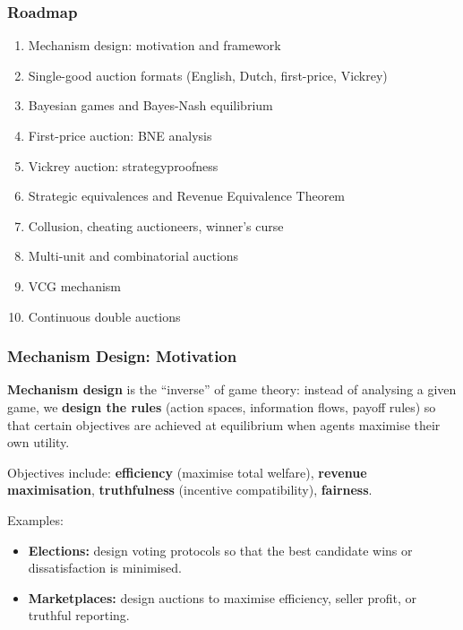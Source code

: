 \subsubsection*{Roadmap}
\begin{enumerate}
  \item Mechanism design: motivation and framework
  \item Single-good auction formats (English, Dutch, first-price, Vickrey)
  \item Bayesian games and Bayes-Nash equilibrium
  \item First-price auction: BNE analysis
  \item Vickrey auction: strategyproofness
  \item Strategic equivalences and Revenue Equivalence Theorem
  \item Collusion, cheating auctioneers, winner's curse
  \item Multi-unit and combinatorial auctions
  \item VCG mechanism
  \item Continuous double auctions
\end{enumerate}

\bigseparator

\subsubsection{Mechanism Design: Motivation}

\begin{defbox}
\textbf{Mechanism design} is the ``inverse'' of game theory: instead of analysing a given game, we \textbf{design the rules} (action spaces, information flows, payoff rules) so that certain objectives are achieved at equilibrium when agents maximise their own utility.

Objectives include: \textbf{efficiency} (maximise total welfare), \textbf{revenue maximisation}, \textbf{truthfulness} (incentive compatibility), \textbf{fairness}.
\end{defbox}

Examples:
\begin{itemize}
  \item \textbf{Elections:} design voting protocols so that the best candidate wins or dissatisfaction is minimised.
  \item \textbf{Marketplaces:} design auctions to maximise efficiency, seller profit, or truthful reporting.
\end{itemize}

